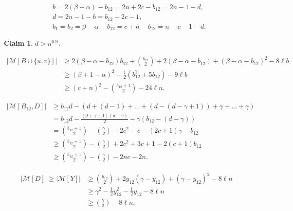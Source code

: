 \documentclass[10pt,a4paper]{amsart}
\newtheorem{claim}{Claim}
\begin{document}
\begin{equation}\label{eq: using c}
\begin{aligned}
	& b = 2(\beta - \alpha) - b_{12} = 2n + 2c - b_{12} = 2n-1-d, \\
	& d = 2n-1 - b = b_{12}-2c-1, \\
	& b_1 = b_2 = \beta - \alpha - b_{12} = c+n-b_{12} = n-c-1-d.
\end{aligned}
\end{equation}

\begin{claim}\label{claim: lower bound of D}
	$d > n^{0.9}$.
\end{claim}

\begin{equation}\label{eq: M[B]}
	\begin{aligned}		
		|\mathcal{M}[B \cup \{u,v\}]| & \ge 2(\beta - \alpha - b_{12})b_{12} + \binom{b_{12}}{2} + 2(\beta - \alpha - b_{12}) + (\beta-\alpha - b_{12})^2 - 8\ell b\\
		& \ge (\beta +1 - \alpha)^2 - \frac{1}{2}(b_{12}^2 + 5b_{12}) - 9\ell b\\
		& \ge (c+n)^2 - \binom{b_{12}+1}{2} - 24\ell n.
	\end{aligned}
	\end{equation}

	\begin{equation}\label{eq: M[B12,D]}
	\begin{aligned}
		|\mathcal{M}[B_{12}, D]|  &\ge b_{12}d - (d + (d - 1) + \ldots +(d-(d-\gamma+1))+ \gamma  + \ldots + \gamma ) \\
		& = b_{12}d - \frac{(d+\gamma+1)(d-\gamma)}{2} - \gamma(b_{12}-(d-\gamma)) \\
		& = \binom{b_{12}+1}{2} - \binom{\gamma}{2} -2c^2 - c - (2c+1)\gamma - b_{12}\\
		& \ge \binom{b_{12}+1}{2} - \binom{\gamma}{2} +2c^2+3c+1-2(c+1)b_{12}\\
		& \ge \binom{b_{12}+1}{2} - \binom{\gamma}{2} -2nc - 2n.
 	\end{aligned}
	\end{equation}

	\begin{equation}\label{eq: M[Y]}
	\begin{aligned}
	\left|\mathcal{M}[D] \right|\geq \left|\mathcal{M}[Y]\right| & \ge \binom{y_{12}}{2} + 2y_{12}(\gamma - y_{12}) + (\gamma-y_{12})^2 - 8\ell n \\
		& \ge \gamma^2 - \frac{1}{2}y_{12}^2 - \frac{1}{2}y_{12} - 8\ell n\\
		& \ge \binom{\gamma}{2} - 8\ell n,
	\end{aligned}
	\end{equation}
\end{document}

